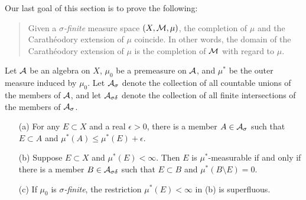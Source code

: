 Our last goal of this section is to prove the following:
\begin{quotation}
    Given a \textit{$\sigma$-finite} measure space $(X, {\mathcal{M}}, \mu)$, the completion of $\mu$ and the Carath\'{e}odory extension of $\mu$ coincide.
    In other words, the domain of the Carath\'{e}odory extension of $\mu$ is the completion of ${\mathcal{M}}$ with regard to $\mu$.
\end{quotation}

\begin{lem}
    Let ${\mathcal{A}}$ be an algebra on $X$, $\mu_0$ be a premeasure on ${\mathcal{A}}$, and $\mu^*$ be the outer measure induced by $\mu_0$.
    Let ${\mathcal{A}}_\sigma$ denote the collection of all countable unions of the members of ${\mathcal{A}}$, and let ${\mathcal{A}}_{\sigma\delta}$ denote the collection of all finite intersections of the members of ${\mathcal{A}}_\sigma$.
    \begin{enumerate}
        \item[(a)]
        {
            For any $E\subset X$ and a real $\epsilon>0$, there is a member $A\in{\mathcal{A}}_\sigma$ such that $E\subset A$ and $\mu^*(A)\leq\mu^*(E)+\epsilon$.
        }
        \item[(b)]
        {
            Suppose $E\subset X$ and $\mu^*(E)<\infty$.
            Then $E$ is $\mu^*$-measurable if and only if there is a member $B\in{\mathcal{A}}_{\sigma\delta}$ such that $E\subset B$ and $\mu^*(B\setminus E)=0$.
        }
        \item[(c)]
        {
            If $\mu_0$ is \textit{$\sigma$-finite}, the restriction $\mu^*(E)<\infty$ in (b) is superfluous.
        }
    \end{enumerate}
\end{lem}
